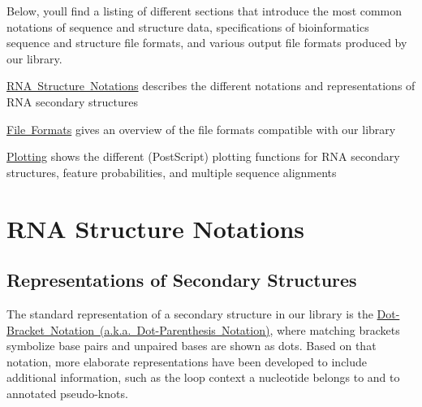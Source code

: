 Below, you\textquotesingle{}ll find a listing of different sections that introduce the most common notations of sequence and structure data, specifications of bioinformatics sequence and structure file formats, and various output file formats produced by our library.


\begin{DoxyItemize}
\item \mbox{\hyperlink{rna_structure_notations}{R\+NA Structure Notations}} describes the different notations and representations of R\+NA secondary structures
\item \mbox{\hyperlink{file_formats}{File Formats}} gives an overview of the file formats compatible with our library
\item \mbox{\hyperlink{plots}{Plotting}} shows the different (Post\+Script) plotting functions for R\+NA secondary structures, feature probabilities, and multiple sequence alignments 
\end{DoxyItemize}\hypertarget{rna_structure_notations}{}\section{R\+NA Structure Notations}\label{rna_structure_notations}
\hypertarget{rna_structure_notations_sec_structure_representations}{}\subsection{Representations of Secondary Structures}\label{rna_structure_notations_sec_structure_representations}
The standard representation of a secondary structure in our library is the \mbox{\hyperlink{rna_structure_notations_dot-bracket-notation}{Dot-\/\+Bracket Notation (a.\+k.\+a. Dot-\/\+Parenthesis Notation)}}, where matching brackets symbolize base pairs and unpaired bases are shown as dots. Based on that notation, more elaborate representations have been developed to include additional information, such as the loop context a nucleotide belongs to and to annotated pseudo-\/knots.

